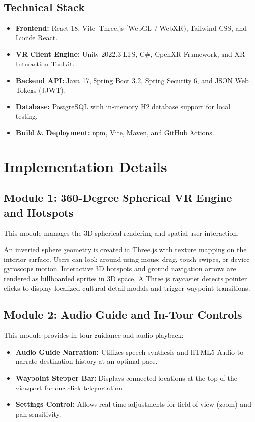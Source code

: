 \documentclass{tietreport}
\begin{document}
\subsection{Technical Stack}

\begin{itemize}
  \item \textbf{Frontend:} React 18, Vite, Three.js (WebGL / WebXR), Tailwind CSS, and Lucide React.
  \item \textbf{VR Client Engine:} Unity 2022.3 LTS, C\#, OpenXR Framework, and XR Interaction Toolkit.
  \item \textbf{Backend API:} Java 17, Spring Boot 3.2, Spring Security 6, and JSON Web Tokens (JJWT).
  \item \textbf{Database:} PostgreSQL with in-memory H2 database support for local testing.
  \item \textbf{Build \& Deployment:} npm, Vite, Maven, and GitHub Actions.
\end{itemize}

\section{Implementation Details}

\subsection{Module 1: 360-Degree Spherical VR Engine and Hotspots}

This module manages the 3D spherical rendering and spatial user interaction. 

An inverted sphere geometry is created in Three.js with texture mapping on the interior surface. Users can look around using mouse drag, touch swipes, or device gyroscope motion. Interactive 3D hotspots and ground navigation arrows are rendered as billboarded sprites in 3D space. A Three.js raycaster detects pointer clicks to display localized cultural detail modals and trigger waypoint transitions.

\subsection{Module 2: Audio Guide and In-Tour Controls}

This module provides in-tour guidance and audio playback:
\begin{itemize}
  \item \textbf{Audio Guide Narration:} Utilizes speech synthesis and HTML5 Audio to narrate destination history at an optimal pace.
  \item \textbf{Waypoint Stepper Bar:} Displays connected locations at the top of the viewport for one-click teleportation.
  \item \textbf{Settings Control:} Allows real-time adjustments for field of view (zoom) and pan sensitivity.
\end{itemize}
\end{document}
